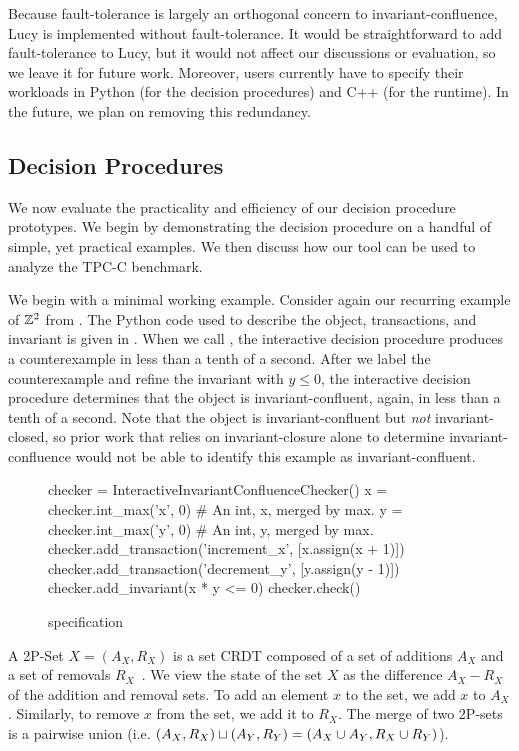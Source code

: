 Because fault-tolerance is largely an orthogonal concern to
invariant-confluence, Lucy is implemented without fault-tolerance. It would be
straightforward to add fault-tolerance to Lucy, but it would not affect our
discussions or evaluation, so we leave it for future work. Moreover, users
currently have to specify their workloads in Python (for the decision
procedures) and C++ (for the runtime). In the future, we plan on removing this
redundancy.

\subsection{Decision Procedures}
We now evaluate the practicality and efficiency of our decision procedure
prototypes. We begin by demonstrating the decision procedure on a handful of
simple, yet practical examples. We then discuss how our tool can be used to
analyze the TPC-C benchmark.

\example[$\ints^2$]
We begin with a minimal working example. Consider again our recurring example
of $\ints^2$ from . The Python code used to describe the object,
transactions, and invariant is given in . When we call
, the interactive decision procedure produces
a counterexample in less than a tenth of a second.  After we label the
counterexample and refine the invariant with $y \leq 0$, the interactive
decision procedure determines that the object is invariant-confluent, again, in
less than a tenth of a second. Note that the object is invariant-confluent but
\emph{not} invariant-closed, so prior work that relies on invariant-closure
alone to determine invariant-confluence would not be able to identify this
example as invariant-confluent.

\begin{figure}[ht]
  \begin{Python}[gobble=4]
    checker = InteractiveInvariantConfluenceChecker()
    x = checker.int_max('x', 0) # An int, x, merged by max.
    y = checker.int_max('y', 0) # An int, y, merged by max.
    checker.add_transaction('increment_x', [x.assign(x + 1)])
    checker.add_transaction('decrement_y', [y.assign(y - 1)])
    checker.add_invariant(x * y <= 0)
    checker.check()
  \end{Python}
  \caption{ specification}
\end{figure}

A 2P-Set $X = (A_X, R_X)$ is a set CRDT composed of a set of additions $A_X$
and a set of removals $R_X$~\cite{shapiro2011comprehensive}. We view the state
of the set $X$ as the difference $A_X - R_X$ of the addition and removal sets.
To add an element $x$ to the set, we add $x$ to $A_X$. Similarly, to remove $x$
from the set, we add it to $R_X$. The merge of two 2P-sets is a pairwise union
(i.e. $(A_X, R_X) \sqcup (A_Y, R_Y) = (A_X \cup A_Y, R_X \cup R_Y)$).

